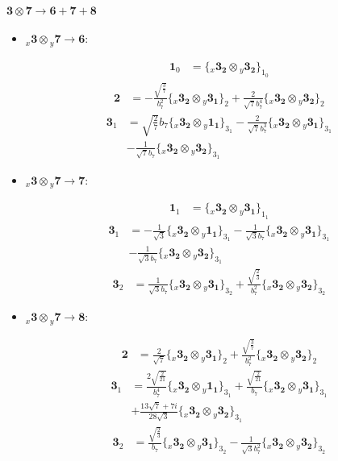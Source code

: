 \documentclass[english]{article}
\newcommand{\cgEqFontsize}{\large}
\newcommand{\rep}[1]{\mathbf{#1}}
\newcommand{\repx}[2]{{}_{#2}\mathbf{#1}}
\newcommand{\tsprod}[2]{\rep{#1}\otimes\rep{#2}}
\newcommand{\tsprodx}[2]{\repx{#1}{x}\otimes\repx{#2}{y}}
\newcommand{\subcgs}[3]{\big\{ \tsprodx{#1}{#2}\big\}^{}_{#3}}
\begin{document}
\paragraph*{\cgEqFontsize $\tsprod{3}{7}\to\rep{6}+\rep{7}+\rep{8}$}
\begin{itemize}
\item $\tsprodx{3}{7}\to\rep{6}$:
\begin{fleqn}
\begin{align*}
\rep{1}_{0} & = \subcgs{3_{2}}{3_{2}}{1_{0}}
\end{align*}
\begin{align*}
\rep{2} & = -\frac{\sqrt{\frac{3}{7}}}{b_7^2}\subcgs{3_{2}}{3_{1}}{2}+\frac{2}{\sqrt{7} b_7^4}\subcgs{3_{2}}{3_{2}}{2}
\end{align*}
\begin{align*}
\rep{3}_{1} & = \sqrt{\frac{2}{7}} b_7\subcgs{3_{2}}{1_{1}}{3_{1}}-\frac{2}{\sqrt{7} b_7^3}\subcgs{3_{2}}{3_{1}}{3_{1}} \\ 
 & -\frac{1}{\sqrt{7} b_7}\subcgs{3_{2}}{3_{2}}{3_{1}}
\end{align*}
\end{fleqn}
\item $\tsprodx{3}{7}\to\rep{7}$:
\begin{fleqn}
\begin{align*}
\rep{1}_{1} & = \subcgs{3_{2}}{3_{1}}{1_{1}}
\end{align*}
\begin{align*}
\rep{3}_{1} & = -\frac{1}{\sqrt{3}}\subcgs{3_{2}}{1_{1}}{3_{1}}-\frac{1}{\sqrt{3} b_7}\subcgs{3_{2}}{3_{1}}{3_{1}} \\ 
 & -\frac{1}{\sqrt{3} b_7}\subcgs{3_{2}}{3_{2}}{3_{1}}
\end{align*}
\begin{align*}
\rep{3}_{2} & = \frac{1}{\sqrt{3} b_7}\subcgs{3_{2}}{3_{1}}{3_{2}}+\frac{\sqrt{\frac{2}{3}}}{b_7^2}\subcgs{3_{2}}{3_{2}}{3_{2}}
\end{align*}
\end{fleqn}
\item $\tsprodx{3}{7}\to\rep{8}$:
\begin{fleqn}
\begin{align*}
\rep{2} & = \frac{2}{\sqrt{7}}\subcgs{3_{2}}{3_{1}}{2}+\frac{\sqrt{\frac{3}{7}}}{b_7^2}\subcgs{3_{2}}{3_{2}}{2}
\end{align*}
\begin{align*}
\rep{3}_{1} & = \frac{2 \sqrt{\frac{2}{21}}}{b_7^4}\subcgs{3_{2}}{1_{1}}{3_{1}}+\frac{\sqrt{\frac{2}{21}}}{b_7}\subcgs{3_{2}}{3_{1}}{3_{1}} \\ 
 & +\frac{13 \sqrt{7}+7 i}{28 \sqrt{3}}\subcgs{3_{2}}{3_{2}}{3_{1}}
\end{align*}
\begin{align*}
\rep{3}_{2} & = \frac{\sqrt{\frac{2}{3}}}{b_7}\subcgs{3_{2}}{3_{1}}{3_{2}}-\frac{1}{\sqrt{3} b_7^2}\subcgs{3_{2}}{3_{2}}{3_{2}}
\end{align*}
\end{fleqn}
\end{itemize}
\end{document}

